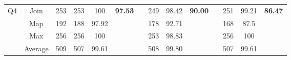 \begin{table}
\begin{tabular}{cccccclccclccc}
\multirow{4}{*}{Q4}             & Join                                & 253                                   & 253                                                                    & 100                                                                       & \multirow{4}{*}{\textbf{97.53}} &                      & 249                                                                    & 98.42                                                                     & \multirow{4}{*}{\textbf{90.00}} &                      & 251                                                                    & 99.21                                                                     & \multirow{4}{*}{\textbf{86.47}} \\
                                & Map                                 & 192                                   & 188                                                                    & 97.92                                                                     &                                 &                      & 178                                                                    & 92.71                                                                     &                                 &                      & 168                                                                    & 87.5                                                                      &                                 \\
                                & Max                                 & 256                                   & 256                                                                    & 100                                                                       &                                 &                      & 253                                                                    & 98.83                                                                     &                                 &                      & 256                                                                    & 100                                                                       &                                 \\
                                & Average                             & 509                                   & 507                                                                    & 99.61                                                                     &                                 &                      & 508                                                                    & 99.80                                                                     &                                 &                      & 507                                                                    & 99.61                                                                     &                                 \\ \hline

\end{tabular}
\end{table}
